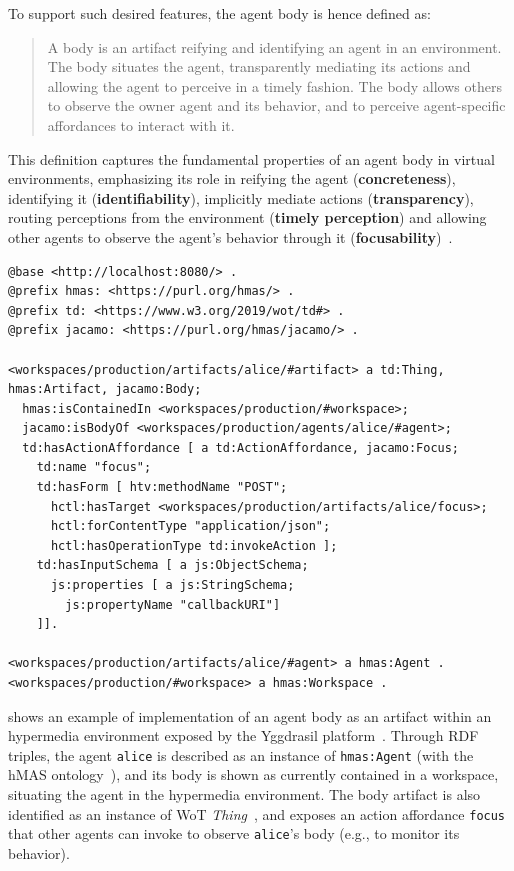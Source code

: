 To support such desired features, the agent body is hence defined as:
\begin{quotation}
A body is an artifact reifying and identifying an agent in an environment. The body situates the agent, transparently mediating its actions and allowing the agent to perceive in a timely fashion.
The body allows others to observe the owner agent and its behavior, and to perceive agent-specific affordances to interact with it.
\end{quotation}

This definition captures the fundamental properties of an agent body in virtual environments, emphasizing its role in reifying the agent (\textbf{concreteness}), identifying it (\textbf{identifiability}), implicitly mediate actions (\textbf{transparency}), routing perceptions from the environment (\textbf{timely perception}) and allowing other agents to observe the agent's behavior through it (\textbf{focusability})~\cite{embodiment2025}.

\begin{code}
\begin{verbatim}
@base <http://localhost:8080/> .
@prefix hmas: <https://purl.org/hmas/> .
@prefix td: <https://www.w3.org/2019/wot/td#> .
@prefix jacamo: <https://purl.org/hmas/jacamo/> .

<workspaces/production/artifacts/alice/#artifact> a td:Thing, hmas:Artifact, jacamo:Body;
  hmas:isContainedIn <workspaces/production/#workspace>;
  jacamo:isBodyOf <workspaces/production/agents/alice/#agent>;
  td:hasActionAffordance [ a td:ActionAffordance, jacamo:Focus;
    td:name "focus";
    td:hasForm [ htv:methodName "POST";
      hctl:hasTarget <workspaces/production/artifacts/alice/focus>;
      hctl:forContentType "application/json";
      hctl:hasOperationType td:invokeAction ];
    td:hasInputSchema [ a js:ObjectSchema;
      js:properties [ a js:StringSchema;
        js:propertyName "callbackURI"]
    ]].

<workspaces/production/artifacts/alice/#agent> a hmas:Agent .
<workspaces/production/#workspace> a hmas:Workspace .
\end{verbatim}
\label{lst:agent-description}
\vspace{1.2em}
\end{code}

 shows an example of implementation of an agent body as an artifact within an hypermedia environment exposed by the Yggdrasil platform~\cite{Ciortea_Boissier_Ricci_2019}.
%
Through \ac{RDF} triples, the agent \texttt{alice} is described as an instance of \texttt{hmas:Agent} (with the \ac{hMAS} ontology~\cite{hmas-core}), and its body is shown as currently contained in a workspace, situating the agent in the hypermedia environment.
%
The body artifact is also identified as an instance of \ac{WoT} \emph{Thing}~\cite{wot-td}, and exposes an action affordance \texttt{focus} that other agents can invoke to observe \texttt{alice}'s body (e.g., to monitor its behavior).

